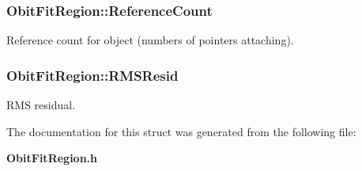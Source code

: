 \subsubsection{ {\bf Obit\-Fit\-Region::Reference\-Count}}\label{structObitFitRegion_o2}


Reference count for object (numbers of pointers attaching). 

\subsubsection{ {\bf Obit\-Fit\-Region::RMSResid}}\label{structObitFitRegion_o8}


RMS residual. 



The documentation for this struct was generated from the following file:\begin{CompactItemize}
\item 
{\bf Obit\-Fit\-Region.h}\end{CompactItemize}
